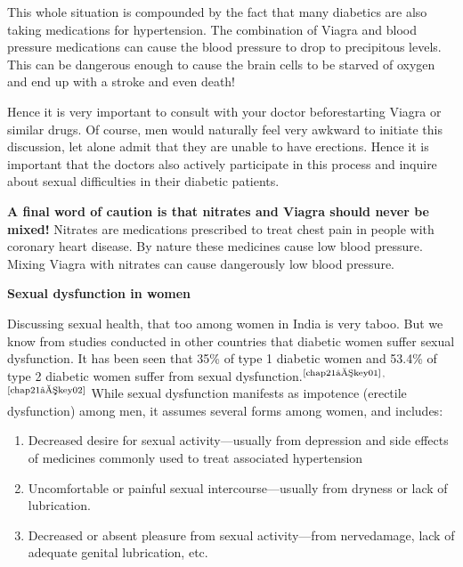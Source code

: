 This whole situation is compounded by the fact that many diabe\-tics are also taking medications for hypertension. The combination of Viagra and blood pressure medications can cause the blood pressure to drop to precipitous levels. This can be dangerous enough to cause the brain cells to be starved of oxygen and end up with a stroke and even death!

Hence it is very important to consult with your doctor before\break starting Viagra or similar drugs. Of course, men would naturally feel very awkward to initiate this discussion, let alone admit that they are unable to have erections. Hence it is important that the doctors also actively participate in this process and inquire about sexual difficulties in their diabetic patients.

\textbf{A final word of caution is that nitrates and Viagra should never be mixed!} Nitrates are medications prescribed to treat chest pain in people with coronary heart disease. By nature these medicines cause low blood pressure. Mixing Viagra with nitrates can cause dangerously low blood pressure.

\noindent\textbf{Sexual dysfunction in women}

Discussing sexual health, that too among women in India is very taboo. But we know from studies conducted in other countries that diabetic women suffer sexual dysfunction. It has been seen that 35\% of type 1 diabetic women and 53.4\% of type 2 diabetic women suffer from sexual dysfunction.$^{\text{\cite{chap21–key01}}}$$^,$$^{\text{\cite{chap21–key02}}}$ While sexual dysfunction manifests as impotence (erectile dysfunction) among men, it assumes several forms among women, and includes:
\begin{enumerate}[•]
\itemsep=0pt
\item Decreased desire for sexual activity—usually from depression and side effects of medicines commonly used to treat associated hypertension
\item Uncomfortable or painful sexual intercourse—usually from dryness or lack of lubrication.
\item Decreased or absent pleasure from sexual activity—from nerve\break damage, lack of adequate genital lubrication, etc.
\end{enumerate}

